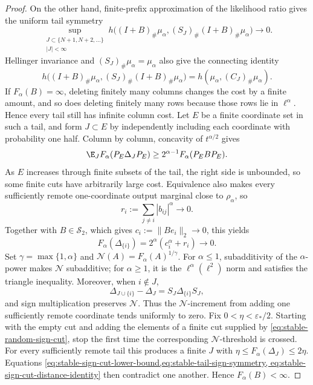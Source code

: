 \begin{proof}
On the other hand, finite-prefix approximation of the likelihood ratio
gives the uniform tail symmetry
\begin{equation}
 \sup_{\substack{J\subset\{N+1,N+2,\ldots\}\\ |J|<\infty}}
 h\bigl((I+B)_\#\mu_\alpha,
        (S_J)_\#(I+B)_\#\mu_\alpha\bigr)
 \longrightarrow0.
 \label{eq:stable-tail-sign-symmetry}
\end{equation}
Hellinger invariance and \((S_J)_\#\mu_\alpha=\mu_\alpha\) also give the
connecting identity
\begin{equation}
 h\bigl((I+B)_\#\mu_\alpha,
        (S_J)_\#(I+B)_\#\mu_\alpha\bigr)
 =h(\mu_\alpha,(C_J)_\#\mu_\alpha).
 \label{eq:stable-sign-cut-distance-identity}
\end{equation}
If \(F_\alpha(B)=\infty\), deleting finitely many columns changes the cost
by a finite amount, and so does deleting finitely many rows because those
rows lie in \(\ell^\alpha\).
Hence every tail still has infinite column cost.
Let \(E\) be a finite coordinate set in such a tail, and form
\(J\subset E\) by independently including each coordinate with probability
one half.
Column by column, concavity of \(t^{\alpha/2}\) gives
\begin{equation}
 \E_JF_\alpha(P_E\Delta_JP_E)
 \ge2^{\alpha-1}F_\alpha(P_EBP_E).
 \label{eq:stable-random-sign-cut}
\end{equation}
As \(E\) increases through finite subsets of the tail, the right side is
unbounded, so some finite cuts have arbitrarily large cost.
Equivalence also makes every sufficiently remote one-coordinate output
marginal close to \(\rho_\alpha\), so
\[
 r_i:=\sum_{j\ne i}|b_{ij}|^\alpha\longrightarrow0.
\]
Together with \(B\in\mathcal S_2\), which gives
\(c_i:=\|Be_i\|_2\to0\), this yields
\[
 F_\alpha(\Delta_{\{i\}})
 =2^\alpha(c_i^\alpha+r_i)\longrightarrow0.
\]
Set \(\gamma=\max\{1,\alpha\}\) and
\(\mathcal N(A)=F_\alpha(A)^{1/\gamma}\).
For \(\alpha\le1\), subadditivity of the \(\alpha\)-power makes
\(\mathcal N\) subadditive; for \(\alpha\ge1\), it is the
\(\ell^\alpha(\ell^2)\) norm and satisfies the triangle inequality.
Moreover, when \(i\notin J\),
\[
 \Delta_{J\cup\{i\}}-\Delta_J
 =S_J\Delta_{\{i\}}S_J,
\]
and sign multiplication preserves \(\mathcal N\).
Thus the \(\mathcal N\)-increment from adding one sufficiently remote
coordinate tends uniformly to zero.
Fix \(0<\eta<\varepsilon_*/2\).
Starting with the empty cut and adding the elements of a finite cut supplied
by \eqref{eq:stable-random-sign-cut}, stop the first time the corresponding
\(\mathcal N\)-threshold is crossed.
For every sufficiently remote tail this produces a finite \(J\) with
\(\eta\le F_\alpha(\Delta_J)\le2\eta\).
Equations
\eqref{eq:stable-sign-cut-lower-bound,eq:stable-tail-sign-symmetry,
eq:stable-sign-cut-distance-identity} then contradict one another.
Hence \(F_\alpha(B)<\infty\).


\end{proof}
